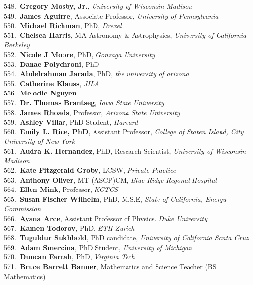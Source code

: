 548.~{\bf Gregory Mosby, Jr.}, {\sl University of Wisconsin-Madison} \\
549.~{\bf James Aguirre}, Associate Professor, {\sl University of Pennsylvania} \\
550.~{\bf Michael Richman}, PhD, {\sl Drexel} \\
551.~{\bf Chelsea Harris}, MA Astronomy \& Astrophysics, {\sl University of California Berkeley} \\
552.~{\bf Nicole J Moore}, PhD, {\sl Gonzaga University } \\
553.~{\bf Danae Polychroni}, PhD \\
554.~{\bf Abdelrahman Jarada}, PhD, {\sl the university of arizona} \\
555.~{\bf Catherine Klauss}, {\sl JILA} \\
556.~{\bf Melodie Nguyen} \\
557.~{\bf Dr. Thomas Brantseg}, {\sl Iowa State University} \\
558.~{\bf James Rhoads}, Professor, {\sl Arizona State University} \\
559.~{\bf Ashley Villar}, PhD Student, {\sl Harvard} \\
560.~{\bf Emily L. Rice, PhD}, Assistant Professor, {\sl College of Staten Island, City University of New York} \\
561.~{\bf Audra K. Hernandez}, PhD, Research Scientist, {\sl University of Wisconsin-Madison} \\
562.~{\bf Kate Fitzgerald Groby}, LCSW, {\sl Private Practice} \\
563.~{\bf Anthony Oliver}, MT (ASCP)CM, {\sl Blue Ridge Regonal Hospital} \\
564.~{\bf Ellen Mink}, Professor, {\sl KCTCS} \\
565.~{\bf Susan Fischer Wilhelm}, PhD, M.S.E, {\sl State of California, Energu Commission} \\
566.~{\bf Ayana Arce}, Assistant Professor of Physics, {\sl Duke University} \\
567.~{\bf Kamen Todorov}, PhD, {\sl ETH Zurich} \\
568.~{\bf Tuguldur Sukhbold}, PhD candidate, {\sl University of California Santa Cruz} \\
569.~{\bf Adam Smercina}, PhD Student, {\sl University of Michigan} \\
570.~{\bf Duncan Farrah}, PhD, {\sl Virginia Tech} \\
571.~{\bf Bruce Barrett Banner}, Mathematics and Science Teacher (BS Mathematics) \\
